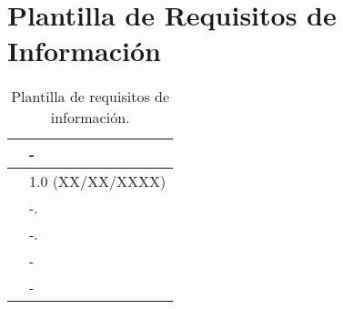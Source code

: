 \section{Plantilla de Requisitos de Información}

\begin{table}[H]
\begin{center}
\begin{tabular}{|p{3cm}|p{10cm}|} \hline
\centering {\bf IRQ-XX} & -  \\ \hline\hline
\centering {\bf Versión} & 1.0 (XX/XX/XXXX) \\ \hline
\centering {\bf Descripción} &  -. \\ \hline
\centering {\bf Datos específicos} &  -. \\ \hline
\centering {\bf Importancia} & - \\ \hline
\centering {\bf Urgencia} & - \\ \hline
\end{tabular}
\caption{Plantilla de requisitos de información.}
\label{enlaceIRQX}
\end{center}
\end{table}